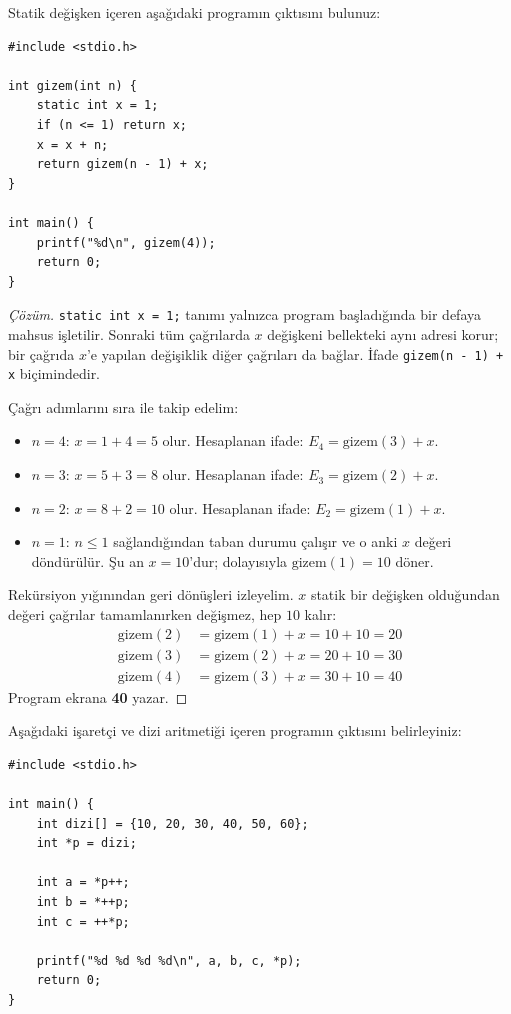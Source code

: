 \begin{example}
Statik değişken içeren aşağıdaki programın çıktısını bulunuz:

\begin{lstlisting}[language=CTemel]
#include <stdio.h>

int gizem(int n) {
    static int x = 1;
    if (n <= 1) return x;
    x = x + n;
    return gizem(n - 1) + x;
}

int main() {
    printf("%d\n", gizem(4));
    return 0;
}
\end{lstlisting}
\end{example}

\begin{proof}[Çözüm]
\texttt{static int x = 1;} tanımı yalnızca program başladığında bir defaya mahsus işletilir. Sonraki tüm çağrılarda $x$ değişkeni bellekteki aynı adresi korur; bir çağrıda $x$'e yapılan değişiklik diğer çağrıları da bağlar. İfade \texttt{gizem(n - 1) + x} biçimindedir.

Çağrı adımlarını sıra ile takip edelim:
\begin{itemize}
    \item $n = 4$: $x = 1 + 4 = 5$ olur. Hesaplanan ifade: $E_4 = \text{gizem}(3) + x$.
    \item $n = 3$: $x = 5 + 3 = 8$ olur. Hesaplanan ifade: $E_3 = \text{gizem}(2) + x$.
    \item $n = 2$: $x = 8 + 2 = 10$ olur. Hesaplanan ifade: $E_2 = \text{gizem}(1) + x$.
    \item $n = 1$: $n \le 1$ sağlandığından taban durumu çalışır ve o anki $x$ değeri döndürülür. Şu an $x = 10$'dur; dolayısıyla $\text{gizem}(1) = 10$ döner.
\end{itemize}

Rekürsiyon yığınından geri dönüşleri izleyelim. $x$ statik bir değişken olduğundan değeri çağrılar tamamlanırken değişmez, hep $10$ kalır:
\begin{align*}
\text{gizem}(2) &= \text{gizem}(1) + x = 10 + 10 = 20 \\
\text{gizem}(3) &= \text{gizem}(2) + x = 20 + 10 = 30 \\
\text{gizem}(4) &= \text{gizem}(3) + x = 30 + 10 = 40
\end{align*}
Program ekrana \textbf{40} yazar.
\end{proof}

\begin{example}
Aşağıdaki işaretçi ve dizi aritmetiği içeren programın çıktısını belirleyiniz:

\begin{lstlisting}[language=CTemel]
#include <stdio.h>

int main() {
    int dizi[] = {10, 20, 30, 40, 50, 60};
    int *p = dizi;
    
    int a = *p++;
    int b = *++p;
    int c = ++*p;
    
    printf("%d %d %d %d\n", a, b, c, *p);
    return 0;
}
\end{lstlisting}
\end{example}

